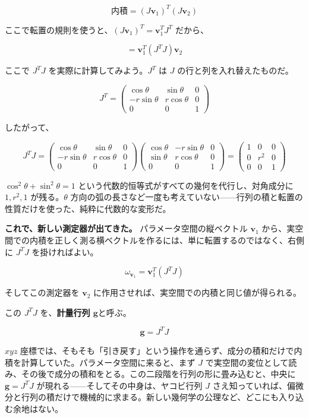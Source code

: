 \documentclass[a4paper,12pt,openany]{book}
\begin{document}
\[\text{内積} = (J\mathbf{v}_1)^T (J\mathbf{v}_2)\]

ここで転置の規則を使うと、\((J\mathbf{v}_1)^T = \mathbf{v}_1^T J^T\)
だから、

\[= \mathbf{v}_1^T (J^T J) \mathbf{v}_2\]

ここで \(J^T J\) を実際に計算してみよう。\(J^T\) は \(J\)
の行と列を入れ替えたものだ。

\[J^T = \begin{pmatrix}
\cos\theta & \sin\theta & 0 \\
-r\sin\theta & r\cos\theta & 0 \\
0 & 0 & 1
\end{pmatrix}\]

したがって、

\[J^T J = \begin{pmatrix}
\cos\theta & \sin\theta & 0 \\
-r\sin\theta & r\cos\theta & 0 \\
0 & 0 & 1
\end{pmatrix}
\begin{pmatrix}
\cos\theta & -r\sin\theta & 0 \\
\sin\theta & r\cos\theta & 0 \\
0 & 0 & 1
\end{pmatrix}
= \begin{pmatrix}
1 & 0 & 0 \\
0 & r^2 & 0 \\
0 & 0 & 1
\end{pmatrix}\]

\(\cos^2\theta + \sin^2\theta = 1\)
という代数的恒等式がすべての幾何を代行し、対角成分に \(1, r^2, 1\)
が残る。\(\theta\)
方向の弧の長さなど一度も考えていない——行列の積と転置の性質だけを使った、純粋に代数的な変形だ。

\textbf{これで、新しい測定器が出てきた。} パラメータ空間の縦ベクトル
\(\mathbf{v}_1\)
から、実空間での内積を正しく測る横ベクトルを作るには、単に転置するのではなく、右側に
\(J^T J\) を掛ければよい。

\[\omega_{\mathbf{v}_1} = \mathbf{v}_1^T (J^T J)\]

そしてこの測定器を \(\mathbf{v}_2\)
に作用させれば、実空間での内積と同じ値が得られる。

この \(J^T J\) を、\textbf{計量行列 $\mathbf{g}$}と呼ぶ。

\[\mathbf{g} = J^T J\]

\(xyz\)
座標では、そもそも「引き戻す」という操作を通らず、成分の積和だけで内積を計算していた。パラメータ空間に来ると、まず
\(J\)
で実空間の変位として読み、その後で成分の積和をとる。この二段階を行列の形に畳み込むと、中央に
\(\mathbf{g}=J^T J\) が現れる——そしてその中身は、ヤコビ行列 \(J\)
さえ知っていれば、偏微分と行列の積だけで機械的に求まる。新しい幾何学の公理など、どこにも入り込む余地はない。
\end{document}
